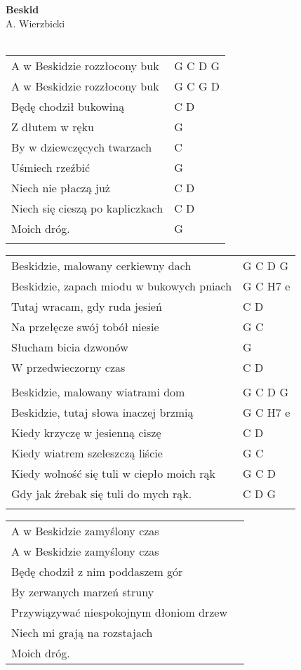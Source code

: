 \documentclass[a5paper]{article}
\begin{document}


\noindent
\fontsize{12pt}{15pt}\selectfont
\textbf{Beskid} \\
\fontsize{8pt}{10pt}\selectfont
A. Wierzbicki \\ \\
\fontsize{10pt}{12pt}\selectfont
{}
\begin{tabular}{@{}p{8.5cm}p{3cm}@{}}
\noindent
A w Beskidzie rozzłocony buk & G C D G \\
A w Beskidzie rozzłocony buk & G C G D \\
Będę chodził bukowiną & C D \\
Z dłutem w ręku & G \\
By w dziewczęcych twarzach & C \\
Uśmiech rzeźbić & G \\
Niech nie płaczą już & C D \\
Niech się cieszą po kapliczkach & C D \\
Moich dróg. & G \\ \\
\end{tabular}

\noindent
\begin{tabular}{@{}p{7.5cm}p{3cm}@{}}
Beskidzie, malowany cerkiewny dach & G C D G \\
Beskidzie, zapach miodu w bukowych pniach & G C H7 e \\
Tutaj wracam, gdy ruda jesień & C D \\
Na przełęcze swój tobół niesie & G C \\
Słucham bicia dzwonów & G \\
W przedwieczorny czas & C D \\ \\
Beskidzie, malowany wiatrami dom & G C D G \\
Beskidzie, tutaj słowa inaczej brzmią & G C H7 e \\
Kiedy krzyczę w jesienną ciszę & C D \\
Kiedy wiatrem szeleszczą liście & G C \\
Kiedy wolność się tuli w ciepło moich rąk & G C D \\
Gdy jak źrebak się tuli do mych rąk. & C D G \\ \\
\end{tabular}

\noindent
\begin{tabular}{@{}p{8.5cm}p{3cm}@{}}
A w Beskidzie zamyślony czas\\
A w Beskidzie zamyślony czas\\
Będę chodził z nim poddaszem gór\\
By zerwanych marzeń struny\\
Przywiązywać niespokojnym dłoniom drzew\\
Niech mi grają na rozstajach\\
Moich dróg.
\end{tabular}
\end{document}
